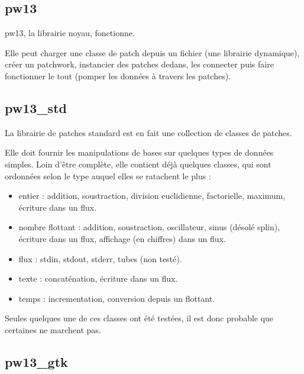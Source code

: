 \documentclass[14pt,a4paper]{article}
\begin{document}
\subsection{pw13}

\par
pw13, la librairie noyau, fonctionne.
\\
\par
Elle peut charger une classe de patch depuis un fichier
 (une librairie dynamique),
 cr\'eer un patchwork, instancier des patches dedans,
 les connecter puis faire fonctionner le tout
 (pomper les donn\'ees \`a travers les patches).


\subsection{pw13\_std}

\par
La librairie de patches standard est en fait une collection de classes de
 patches.
\\
\par
Elle doit fournir les manipulations de bases sur quelques types
 de donn\'ees simples. Loin d'\^etre compl\`ete, elle contient
 d\'ej\`a quelques classes, qui sont ordonn\'ees selon le type
 auquel elles se ratachent le plus :
\begin{itemize}
\item entier : addition, soustraction, division euclidienne,
 factorielle, maximum, \'ecriture dans un flux.
\item nombre flottant : addition, soustraction, oscillateur,
 sinus (d\'esol\'e splin), \'ecriture dans un flux, affichage
 (en chiffres) dans un flux.
\item flux : stdin, stdout, stderr, tubes (non test\'e).
\item texte : concat\'enation, \'ecriture dans un flux.
\item temps : incrementation, conversion depuis un flottant.
\end{itemize}

\par
Seules quelques une de ces classes ont \'et\'e test\'ees,
 il est donc probable que certaines ne marchent pas.


\subsection{pw13\_gtk}
\end{document}
